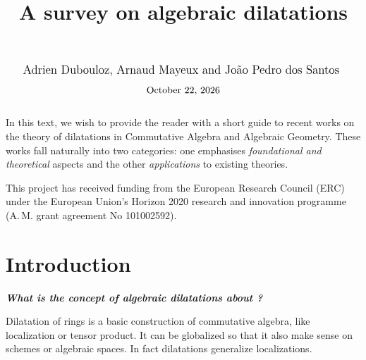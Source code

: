\documentclass[10pt]{alggeom}
\theoremstyle{definition}
\numberwithin{equation}{section}
\begin{document}
\title{A survey on algebraic dilatations}





\maketitle
\[\text{{\large {Adrien Dubouloz, Arnaud Mayeux and João Pedro dos Santos }}}\]

\[\text{\today} \]

$~~$




\abst
In this text, we wish to provide the reader with a short guide to recent works on  the theory of  dilatations in  Commutative Algebra and Algebraic Geometry. These works fall naturally into two categories: one emphasises {\it foundational and theoretical} aspects and the other {\it applications} to existing theories.
\xabst

\tableofcontents

\bigskip 
\bigskip 
\bigskip

{\small\ackn
 {{This project has received funding from the European Research Council (ERC) under the European Union’s Horizon 2020 research and innovation programme (A.\,M. grant agreement No 101002592).}}
\xackn}

\newpage

\section*{Introduction} 


\begin{center}
\textbf{\textit{{What is the concept of algebraic dilatations about ? }}}
\end{center}
Dilatation of rings is a basic construction of commutative algebra, like localization or tensor product. It can be globalized so that it also make sense on schemes or algebraic spaces. In fact dilatations generalize localizations.
\end{document}
